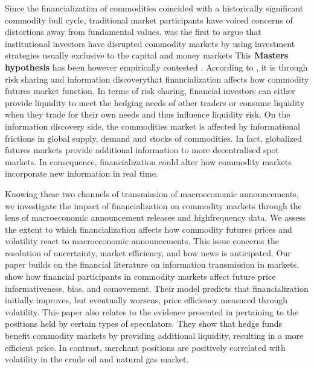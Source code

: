 \documentclass[12pt]{article}
\begin{document}
Since the financialization of commodities coincided with a historically significant commodity bull cycle, traditional market participants have voiced concerns of distortions away from fundamental values. \citet{masters2009testimony} was the first to argue that institutional investors have disrupted commodity markets by using investment strategies usually exclusive to the capital and money markets This \textbf{Masters hypothesis} has been however empirically contested \citep{irwin2011index,irwin2012testing,irwin2012financialization}. According to \citet{cheng2014financialization}, it is through risk sharing and information discoverythat financialization affects how commodity futures market function. In terms of risk sharing, financial investors can either provide liquidity to meet the hedging needs of other traders or consume liquidity when they trade for their own needs \citep{kang2020tale} and thus influence liquidity risk. On the information discovery side, the commodities market is affected by informational frictions in global supply, demand and stocks of commodities. In fact, globalized futures markets provide additional information to more decentralised spot markets. In consequence, financialization could alter how commodity markets incorporate new information in real time.

Knowing these two channels of transmission of macroeconomic announcements, we investigate the impact of financialization on commodity markets through the lens of macroeconomic announcement releases and highfrequency data. We assess the extent to which financialization  affects how commodity futures prices and volatility react to macroeconomic announcements. This issue concerns the  resolution of uncertainty, market efficiency, and how news is anticipated. Our paper builds on the financial literature on  information transmission in markets. \citet{goldstein2019commodity} show how financial participants in commodity markets affect future price informativeness, bias, and comovement. Their model predicts that financialization initially improves, but eventually worsens, price efficiency measured through volatility. This paper also relates to the evidence presented in \citet{brunetti2016speculators} pertaining to the positions held by certain types of speculators. They show that hedge funds benefit commodity markets by providing additional liquidity, resulting in a more efficient price. In contrast, merchant positions are positively correlated with volatility in the crude oil and natural gas market. 
\end{document}
